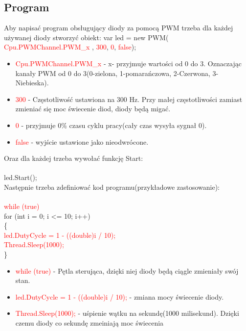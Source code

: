 \documentclass{article}
\begin{document}
\subsection{Program}
Aby napisać program obsługujący diody za pomocą PWM trzeba dla każdej używanej diody stworzyć obiekt:\newline \newline
 var led = new PWM(\space \textcolor{red}{ Cpu.PWMChannel.PWM\_x },\space \textcolor{red}{ 300},\space \textcolor{red}{ 0}, \space \textcolor{red}{ false});
\begin{itemize}
\item \textcolor{red}{Cpu.PWMChannel.PWM\_x} - x- przyjmuje wartości od 0 do 3. Oznaczając kanały PWM od 0 do 3(0-zielona, 1-pomarańczowa, 2-Czerwona, 3-Niebieska).
\item \textcolor{red}{300} - Częstotliwość ustawiona na 300 Hz. Przy małej częstotliwości zamiast zmieniać się moc świecenie diod, diody będą migać.
\item \textcolor{red}{0} - przyjmuje 0\% czasu cyklu pracy(cały czas wysyła sygnał 0).
\item \textcolor{red}{false} - wyjście ustawione jako nieodwrócone.
\end{itemize}
Oraz dla każdej trzeba wywołać funkcję Start:\\\\
led.Start();\\
Następnie trzeba zdefiniować kod programu(przykładowe zastosowanie):\\\\
\textcolor{red}{while (true)}\\
for (int i = 0; i \textless = 10; i++)\\
\{\\
\textcolor{red}{led.DutyCycle = 1 - ((double)i / 10);}\\ 
\textcolor{red}{Thread.Sleep(1000);}\\ 
\}
\begin{itemize}
\item \textcolor{red}{while (true)} - Pętla sterująca, dzięki niej diody będą ciągle zmieniały swój stan.
\item \textcolor{red}{led.DutyCycle = 1 - ((double)i / 10);} - zmiana mocy świecenie diody.
\item \textcolor{red}{Thread.Sleep(1000);} - uśpienie wątku na sekundę(1000 milisekund). Dzięki czemu diody co sekundę zmeiniają moc świecenia
\end{itemize}
\end{document}
